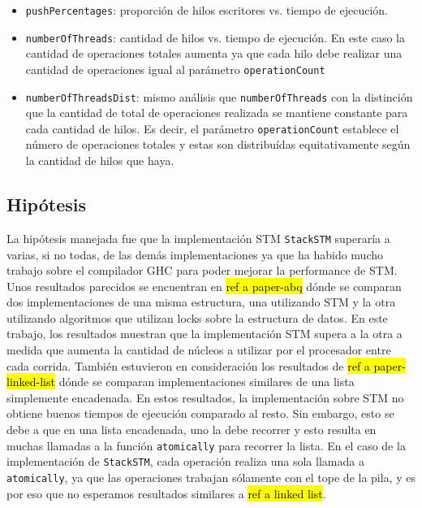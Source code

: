\begin{itemize}
    \item \texttt{pushPercentages}: proporción de hilos escritores vs. tiempo de ejecución.
    \item \texttt{numberOfThreads}: cantidad de hilos vs. tiempo de ejecución. En este caso la cantidad de operaciones totales aumenta ya que cada hilo debe realizar una cantidad de operaciones igual al parámetro \texttt{operationCount}
    \item \texttt{numberOfThreadsDist}: mismo análisis que \texttt{numberOfThreads} con la distinción que la cantidad de total de operaciones realizada se mantiene constante para cada cantidad de hilos. Es decir, el parámetro \texttt{operationCount} establece el número de operaciones totales y estas son distribuídas equitativamente según la cantidad de hilos que haya.
\end{itemize}

\subsection{Hipótesis}
La hipótesis manejada fue que la implementación STM \texttt{StackSTM} superaría a varias, si no todas, de las demás implementaciones ya que ha habido mucho trabajo sobre el compilador GHC para poder mejorar la performance de STM. Unos resultados parecidos se encuentran en \hl{ref a paper-abq} dónde se comparan dos implementaciones de una misma estructura, una utilizando STM y la otra utilizando algoritmos que utilizan locks sobre la estructura de datos. En este trabajo, los resultados muestran que la implementación STM supera a la otra a medida que aumenta la cantidad de núcleos a utilizar por el procesador entre cada corrida.
También estuvieron en consideración los resultados de \hl{ref a paper-linked-list} dónde se comparan implementaciones similares de una lista simplemente encadenada. En estos resultados, la implementación sobre STM no obtiene buenos tiempos de ejecución comparado al resto. Sin embargo, esto se debe a que en una lista encadenada, uno la debe recorrer y esto resulta en muchas llamadas a la función \texttt{atomically} para recorrer la lista. En el caso de la implementación de \texttt{StackSTM}, cada operación realiza una sola llamada a \texttt{atomically}, ya que las operaciones trabajan sólamente con el tope de la pila, y es por eso que no esperamos resultados similares a \hl{ref a linked list}.


